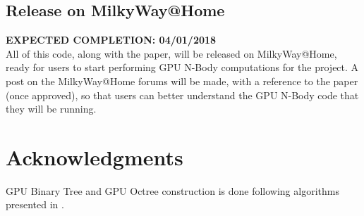 \documentclass[fleqn,10pt]{SelfArx} %
\begin{document}
\subsection{Release on MilkyWay@Home}
\textbf{EXPECTED COMPLETION: 04/01/2018}\\
All of this code, along with the paper, will be released on MilkyWay@Home, ready for users to start performing GPU N-Body computations for the project. A post on the MilkyWay@Home forums will be made, with a reference to the paper (once approved), so that users can better understand the GPU N-Body code that they will be running.

\section*{Acknowledgments} %


GPU Binary Tree and GPU Octree construction is done following algorithms presented in \cite{Karras:2012}.




\end{document}
